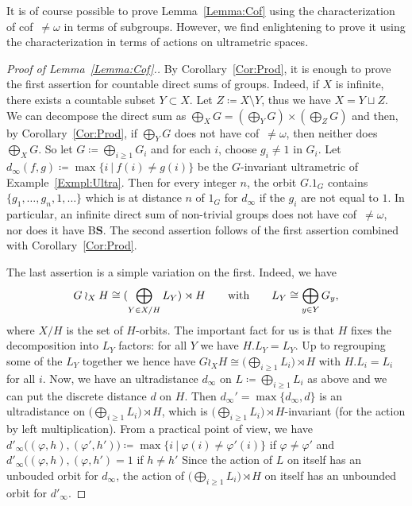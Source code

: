 \documentclass[a4paper]{article}
\theoremstyle{definition}
\newcommand*{\BS}{B$\mathbf{S}$}
\newcommand{\setst}[2]{\{#1\ |\ #2\}}
\begin{document}
%
%
It is of course possible to prove Lemma~\ref{Lemma:Cof} using the characterization of cof~$\neq\omega$ in terms of subgroups. However, we find enlightening to prove it using the characterization in terms of actions on ultrametric spaces.
%
%
\begin{proof}[Proof of Lemma~\ref{Lemma:Cof}.]
By Corollary~\ref{Cor:Prod}, it is enough to prove the first assertion for countable direct sums of groups. Indeed, if $X$ is infinite, there exists a countable subset $Y \subset X$. Let $Z \coloneqq X\setminus Y$, thus we have $X = Y \sqcup Z$. We can decompose the direct sum as $\bigoplus_XG = (\bigoplus_YG) \times (\bigoplus_ZG)$ and then, by Corollary~\ref{Cor:Prod}, if $\bigoplus_YG$ does not have cof~$\neq\omega$, then neither does $\bigoplus_XG$.
So let $G\coloneqq \bigoplus_{i\geq 1}G_i$ and for each $i$, choose $g_i\neq 1$ in $G_i$.
Let $d_\infty(f,g)\coloneqq\max\setst{i}{f(i)\neq g(i)}$ be the $G$-invariant ultrametric of Example~\ref{Exmpl:Ultra}.
Then for every integer $n$, the orbit $G.1_G$ contains $\{g_1,\dots,g_n,1,\dots\}$ which is at distance $n$ of $1_G$ for $d_\infty$ if the $g_i$ are not equal to $1$.
In particular, an infinite direct sum of non-trivial groups does not have cof~$\neq\omega$, nor does it have \BS.
The second assertion follows of the first assertion combined with Corollary~\ref{Cor:Prod}.

The last assertion is a simple variation on the first.
Indeed, we have
\[
	G\wr_XH\cong(\bigoplus_{Y\in X/H}L_Y)\rtimes H\qquad\textnormal{with}\qquad L_Y\cong\bigoplus_{y\in Y}G_y,
\]
where $X/H$ is the set of $H$-orbits.
The important fact for us is that $H$ fixes the decomposition into $L_Y$ factors: for all $Y$ we have $H.L_Y=L_Y$.
Up to regrouping some of the $L_Y$ together we hence have $G\wr_XH\cong\bigl(\bigoplus_{i\geq 1}L_i\bigr)\rtimes H$ with $H.L_i=L_i$ for all $i$.
Now, we have an ultradistance $d_\infty$ on $L\coloneqq\bigoplus_{i\geq 1}L_i$ as above and we can put the discrete distance $d$ on $H$.
Then $d_\infty'=\max\{d_\infty,d\}$ is an ultradistance on $\bigl(\bigoplus_{i\geq 1}L_i\bigr)\rtimes H$, which is $\bigl(\bigoplus_{i\geq 1}L_i\bigr)\rtimes H$-invariant (for the action by left multiplication).
From a practical point of view, we have $d'_\infty\bigl((\varphi,h),(\varphi',h')\bigr)\coloneqq\max\setst{i}{\varphi(i)\neq \varphi'(i)}$ if $\varphi\neq \varphi'$ and $d'_\infty\bigl((\varphi,h),(\varphi,h')=1$ if $h\neq h'$
Since the action of $L$ on itself has an unbouded orbit for $d_\infty$, the action of $\bigl(\bigoplus_{i\geq 1}L_i\bigr)\rtimes H$ on itself has an unbounded orbit for $d'_\infty$.
\end{proof}
\end{document}
